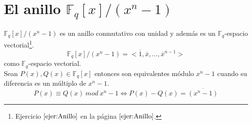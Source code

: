 %
%

\section{El anillo $\mathbb{F}_q[x]/(x^n-1)$}

$\mathbb{F}_q[x]/(x^n-1)$ es un anillo conmutativo con unidad y adem\'as es
un $\mathbb{F}_q$-espacio vectorial\footnote{Ejercicio $\ref{ejer:Anillo}$ en la
p\'agina $\pageref{ejer:Anillo}$.}.
\begin{displaymath}
\mathbb{F}_q[x]/(x^n-1)=<\overline{1},\overline{x},\dots,\overline{x}^{n-1}>
\end{displaymath}
como $\mathbb{F}_q$-espacio vectorial.\\

Sean $P(x),Q(x)\in \mathbb{F}_q[x]$ entonces son equivalentes m\'odulo $x^n-1$
cuando su diferencia es un m\'ultiplo de $x^n-1$.
\begin{displaymath}
P(x)\equiv Q(x)\ mod\ x^n-1 \Longleftrightarrow P(x)-Q(x)=
\stackrel{\cdot }{(x^n-1)}
\end{displaymath}


